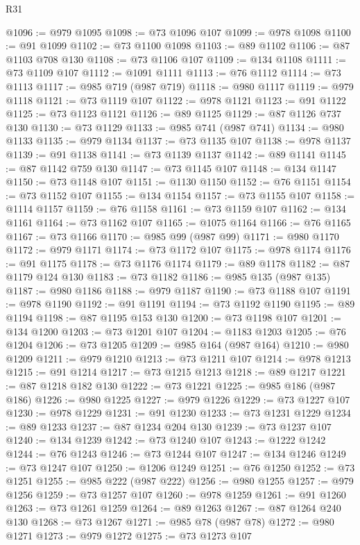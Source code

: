 \begin{lexlean}{R31}
\begin{coremodule}
@1096 := @979 @1095
@1098 := @73 @1096 @107
@1099 := @978 @1098
@1100 := @91 @1099
@1102 := @73 @1100 @1098
@1103 := @89 @1102
@1106 := @87 @1103 @708 @130
@1108 := @73 @1106 @107
@1109 := @134 @1108
@1111 := @73 @1109 @107
@1112 := @1091 @1111
@1113 := @76 @1112
@1114 := @73 @1113
@1117 := @985 @719 (@987 @719)
@1118 := @980 @1117
@1119 := @979 @1118
@1121 := @73 @1119 @107
@1122 := @978 @1121
@1123 := @91 @1122
@1125 := @73 @1123 @1121
@1126 := @89 @1125
@1129 := @87 @1126 @737 @130
@1130 := @73 @1129
@1133 := @985 @741 (@987 @741)
@1134 := @980 @1133
@1135 := @979 @1134
@1137 := @73 @1135 @107
@1138 := @978 @1137
@1139 := @91 @1138
@1141 := @73 @1139 @1137
@1142 := @89 @1141
@1145 := @87 @1142 @759 @130
@1147 := @73 @1145 @107
@1148 := @134 @1147
@1150 := @73 @1148 @107
@1151 := @1130 @1150
@1152 := @76 @1151
@1154 := @73 @1152 @107
@1155 := @134 @1154
@1157 := @73 @1155 @107
@1158 := @1114 @1157
@1159 := @76 @1158
@1161 := @73 @1159 @107
@1162 := @134 @1161
@1164 := @73 @1162 @107
@1165 := @1075 @1164
@1166 := @76 @1165
@1167 := @73 @1166
@1170 := @985 @99 (@987 @99)
@1171 := @980 @1170
@1172 := @979 @1171
@1174 := @73 @1172 @107
@1175 := @978 @1174
@1176 := @91 @1175
@1178 := @73 @1176 @1174
@1179 := @89 @1178
@1182 := @87 @1179 @124 @130
@1183 := @73 @1182
@1186 := @985 @135 (@987 @135)
@1187 := @980 @1186
@1188 := @979 @1187
@1190 := @73 @1188 @107
@1191 := @978 @1190
@1192 := @91 @1191
@1194 := @73 @1192 @1190
@1195 := @89 @1194
@1198 := @87 @1195 @153 @130
@1200 := @73 @1198 @107
@1201 := @134 @1200
@1203 := @73 @1201 @107
@1204 := @1183 @1203
@1205 := @76 @1204
@1206 := @73 @1205
@1209 := @985 @164 (@987 @164)
@1210 := @980 @1209
@1211 := @979 @1210
@1213 := @73 @1211 @107
@1214 := @978 @1213
@1215 := @91 @1214
@1217 := @73 @1215 @1213
@1218 := @89 @1217
@1221 := @87 @1218 @182 @130
@1222 := @73 @1221
@1225 := @985 @186 (@987 @186)
@1226 := @980 @1225
@1227 := @979 @1226
@1229 := @73 @1227 @107
@1230 := @978 @1229
@1231 := @91 @1230
@1233 := @73 @1231 @1229
@1234 := @89 @1233
@1237 := @87 @1234 @204 @130
@1239 := @73 @1237 @107
@1240 := @134 @1239
@1242 := @73 @1240 @107
@1243 := @1222 @1242
@1244 := @76 @1243
@1246 := @73 @1244 @107
@1247 := @134 @1246
@1249 := @73 @1247 @107
@1250 := @1206 @1249
@1251 := @76 @1250
@1252 := @73 @1251
@1255 := @985 @222 (@987 @222)
@1256 := @980 @1255
@1257 := @979 @1256
@1259 := @73 @1257 @107
@1260 := @978 @1259
@1261 := @91 @1260
@1263 := @73 @1261 @1259
@1264 := @89 @1263
@1267 := @87 @1264 @240 @130
@1268 := @73 @1267
@1271 := @985 @78 (@987 @78)
@1272 := @980 @1271
@1273 := @979 @1272
@1275 := @73 @1273 @107

\end{coremodule}
\end{lexlean}
